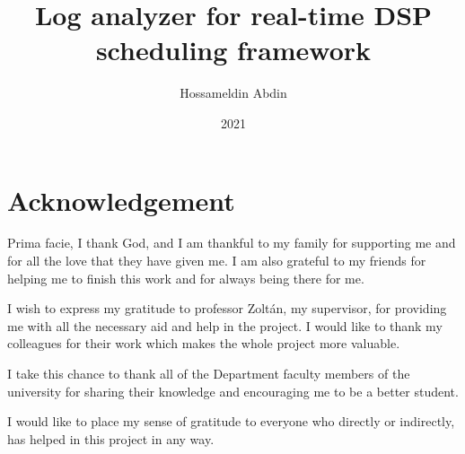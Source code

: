 \documentclass[
]{elteikthesis}[2020/11/23]
\title{Log analyzer for real-time DSP scheduling framework} %
\date{2021} %
\author{Hossameldin Abdin}
\affiliation{tanársegéd, MSc Computer Science} %
\begin{document}




\maketitle

\section{Acknowledgement}
Prima facie, I thank God, and I am thankful to my family for supporting me and for all the love that 
they have given me.
I am also grateful to my friends for helping me to finish this work and for always being
there for me.

I wish to express my gratitude to professor Zoltán, my supervisor, for providing me with all the necessary aid and
help in the project. I would like to thank my colleagues for their work which makes
the whole project more valuable.

I take this chance to thank all of the Department faculty members of the university for sharing their knowledge
and encouraging me to be a better student.

I would like to place my sense of gratitude to everyone who directly or indirectly, has helped
in this project in any way.
\tableofcontents
\cleardoublepage


\cleardoublepage


\cleardoublepage


\cleardoublepage


\cleardoublepage

% 

\printbibliography[title=\biblabel]
\cleardoublepage
\end{document}
